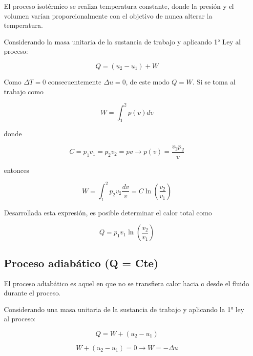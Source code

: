 El proceso isotérmico se realiza temperatura constante, donde la presión y el volumen varían proporcionalmente con el objetivo de nunca alterar la temperatura.

Considerando la masa unitaria de la sustancia de trabajo y aplicando 1° Ley al proceso:

\begin{equation*}
    Q = \left(u_2 - u_1\right) + W
\end{equation*}

Como $\Delta T = 0$ consecuentemente $\Delta u = 0$, de este modo $Q = W$. Si se toma al trabajo como

\begin{equation*}
    W = \int_{1}^{2} p(v) dv 
\end{equation*}

donde

\begin{equation*}\tag{Por T = Cte}
    C = p_1 v_1 = p_2 v_2 = p v \longrightarrow p(v) = \dfrac{v_2 p_2}{v} 
\end{equation*}

entonces 

\begin{equation*}
    W = \int_{1}^{2} p_2 v_2 \dfrac{dv}{v} = C \ln \left(\dfrac{v_2}{v_1}\right)
\end{equation*}

Desarrollada esta expresión, es posible determinar el calor total como

\begin{equation*}
    Q =  p_1 v_1 \ln \left(\dfrac{v_2}{v_1} \right)
\end{equation*}

\subsection{Proceso adiabático (Q = Cte)}

El proceso adiabático es aquel en que no se transfiera calor hacia o desde el fluido durante el proceso.

Considerando una masa unitaria de la sustancia de trabajo y aplicando la 1° ley al proceso:

\begin{equation*}
    Q = W + (u_2 - u_1) 
\end{equation*}

\begin{equation*}
    W + (u_2 - u_1) = 0  \longrightarrow W = -\Delta u 
\end{equation*}


